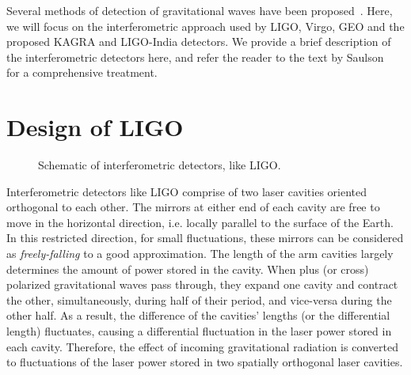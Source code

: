 
Several methods of detection of gravitational 
waves have been proposed~\cite{PhysRevLett.20.1307,PhysRevD.54.1264,1978SvA....22...36S,
1979ApJ...234.1100D}. Here, we will focus on the interferometric approach
used by LIGO, Virgo, GEO and the proposed KAGRA
and LIGO-India detectors. We provide a brief description of the interferometric
detectors here, and refer the reader to the text by 
Saulson~\cite{Saulson:1995zi} for a comprehensive treatment.

\section{Design of LIGO}\label{sec:ligo_construction}
\begin{figure}
 \begin{center}
 \end{center}
\caption{\label{fig:ligo}Schematic of interferometric detectors, like LIGO.}
\end{figure}
%
Interferometric detectors like LIGO comprise of two laser cavities oriented 
orthogonal to each other. The mirrors at either end of each cavity are free to move 
in the horizontal direction, i.e. locally parallel to the surface of the Earth. 
In this restricted direction, for small fluctuations, these mirrors can be
considered as {\it freely-falling} to a good approximation.
The length of the arm cavities largely determines the amount of power stored
in the cavity. 
%
When plus (or cross) polarized gravitational waves pass through, they expand 
one cavity and contract the other, simultaneously, during half of their period,
and vice-versa during the other half. As a result, the difference of the cavities'
lengths (or the differential length) fluctuates, causing a differential fluctuation
in the laser power stored in each cavity. 
% 
Therefore, the effect of incoming gravitational radiation is converted to 
fluctuations of the laser power stored in two spatially orthogonal laser cavities.


